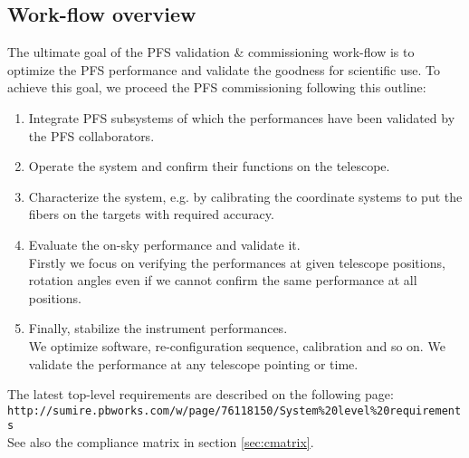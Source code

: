 \subsection{Work-flow overview}

The ultimate goal of the PFS validation \& commissioning work-flow is to optimize the PFS performance and validate the goodness for scientific use.
To achieve this goal, we proceed the PFS commissioning following this outline:
\begin{enumerate}
\item Integrate PFS subsystems of which the performances have been validated by the PFS collaborators.
\item Operate the system and confirm their functions on the telescope.
\item Characterize the system, e.g. by calibrating the coordinate systems to put the fibers on the targets with required accuracy.
\item Evaluate the on-sky performance and validate it. \\
Firstly we focus on verifying the performances at given telescope positions, rotation angles even if we cannot confirm the same performance at all positions.
\item Finally, stabilize the instrument performances. \\
We optimize software, re-configuration sequence, calibration and so on.
We validate the performance at any telescope pointing or time.
\end{enumerate}

The latest top-level requirements are described on the following page: \\
{\tt http://sumire.pbworks.com/w/page/76118150/System\%20level\%20requirements}\\
See also the compliance matrix in section \ref{sec:cmatrix}.

\bigskip

